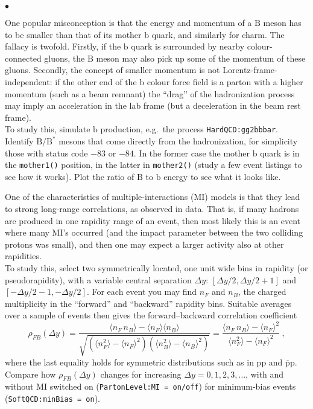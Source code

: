 \documentclass[12pt,a4paper]{article}
\renewcommand{\b}{{\mathrm b}}
\newcommand{\p}{{\mathrm p}}
\renewcommand{\B}{{\mathrm B}}
\newcommand{\pbar}{\overline{\mathrm p}}
\newenvironment{Itemize}{\begin{list}{$\bullet$}%
{\setlength{\topsep}{0.4mm}\setlength{\partopsep}{0.4mm}%
\setlength{\itemsep}{0.4mm}\setlength{\parsep}{0.4mm}}}%
{\end{list}}
\begin{document}
\begin{Itemize}
\item One popular misconception is that the energy and momentum of a 
$\B$ meson has to be smaller than that of its mother $\b$ quark, and 
similarly for charm. The fallacy is twofold. Firstly, if the $\b$ 
quark is surrounded by nearby colour-connected gluons, the $\B$ meson 
may also pick up some of the momentum of these gluons. Secondly, the
concept of smaller momentum is not Lorentz-frame-independent:
if the other end of the $\b$ colour force field is a parton with a
higher momentum (such as a beam remnant) the ``drag'' of the 
hadronization process may imply an acceleration in the lab frame
(but a deceleration in the beam rest frame).\\
To study this, simulate $\b$ production, e.g.\ the process
\texttt{HardQCD:gg2bbbar}. Identify $\B / \B^*$ mesons that
come directly from the hadronization, for simplicity those with
status code $-83$ or $-84$. In the former case the mother $\b$
quark is in the \texttt{mother1()} position, in the latter in
\texttt{mother2()} (study a few event listings to see how it works).
Plot the ratio of $\B$ to $\b$ energy to see what it looks like.       

\item One of the characteristics of multiple-interactions (MI) models
is that they lead to strong long-range correlations, as observed in
data. That is, if many hadrons are produced in one rapidity range
of an event, then most likely this is an event where many MI's
occurred (and the impact parameter between the two colliding protons
was small), and then one may expect a larger activity also at other
rapidities.\\
To study this, select two symmetrically located, one unit wide bins 
in rapidity (or pseudorapidity), with a variable central separation 
$\Delta y$: $\left[ \Delta y/2, \Delta y/2 + 1 \right]$ and 
$\left[ - \Delta y/2 - 1, - \Delta y/2 \right]$.
For each event you may find $n_F$ and $n_B$, the charged multiplicity 
in the ``forward'' and ``backward'' rapidity bins. Suitable averages 
over a sample of events then gives the forward--backward correlation 
coefficient
\[
\rho_{FB}(\Delta y) = \frac{\langle n_F \, n_B \rangle 
- \langle n_F \rangle \langle n_B \rangle}%
{\sqrt{(\langle n_F^2 \rangle - \langle n_F \rangle^2)
(\langle n_B^2 \rangle - \langle n_B \rangle^2)}} 
= \frac{\langle n_F \, n_B \rangle - \langle n_F \rangle^2}%
{\langle n_F^2 \rangle - \langle n_F \rangle^2} ~,
\]
where the last equality holds for symmetric distributions such as
in $\p\p$ and $\pbar\p$.\\
Compare how $\rho_{FB}(\Delta y)$ changes for increasing
$\Delta y = 0, 1, 2, 3, \ldots$, with and without MI switched on
(\texttt{PartonLevel:MI = on/off}) for minimum-bias events
(\texttt{SoftQCD:minBias = on}).


\end{Itemize}
\end{document}
